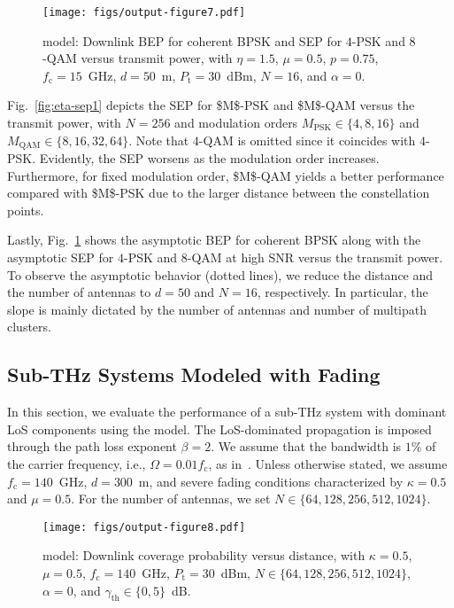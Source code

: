 \documentclass[journal,twocolumn]{IEEEtran}
\begin{document}
\begin{figure}[t]
    \centering
    \texttt{[image: figs/output-figure7.pdf]}
    \caption{\Ehm{} model: Downlink BEP for coherent \ac{BPSK} and \ac{SEP} for $4$-PSK and $8$-QAM versus transmit power, with $\eta = 1.5$, $\mu = 0.5$, $p=0.75$, $f_{\textrm{c}} = 15$~GHz, $d = 50$~m, $P_{\textrm{t}} = 30$~dBm, $N = 16$, and $\alpha=0$.}
    \label{fig:eta-asympt}
\end{figure}

Fig.~\ref{fig:eta-sep1} depicts the \ac{SEP} for \ac{$M$-PSK} and \ac{$M$-QAM} versus the transmit power, with $N=256$ and modulation orders $M_{\textrm{PSK}}\in\{4,8,16\}$ and $M_{\textrm{QAM}}\in\{8,16,32,64\}$. Note that $4$-QAM is omitted since it coincides with $4$-PSK. Evidently, the \ac{SEP} worsens as the modulation order increases. Furthermore, for fixed modulation order, \ac{$M$-QAM} yields a better performance compared with \ac{$M$-PSK} due to the larger distance between the constellation points.

Lastly, Fig.~\ref{fig:eta-asympt} shows the asymptotic \ac{BEP} for coherent \ac{BPSK} along with the asymptotic \ac{SEP} for $4$-PSK and $8$-QAM at high \ac{SNR} versus the transmit power. To observe the asymptotic behavior (dotted lines), we reduce the distance and the number of antennas to $d=50$ and $N=16$, respectively. In particular, the slope is mainly dictated by the number of antennas and number of multipath clusters.



\subsection{Sub-THz Systems Modeled with \km{} Fading} \label{sec:num_subthz}

In this section, we evaluate the performance of a sub-THz system with dominant \ac{LoS} components using the \km{} model. The \ac{LoS}-dominated propagation is imposed through the path loss exponent $\beta = 2$. We assume that the bandwidth is $1 \%$ of the carrier frequency, i.e., $\Omega = 0.01 f_{\textrm{c}}$, as in~\cite{Xin22}. Unless otherwise stated, we assume $f_{\textrm{c}} = 140$~GHz, $d=300$~m, and severe fading conditions characterized by $\kappa = 0.5$ and $\mu = 0.5$. For the number of antennas, we set $N \in \{64,128,256,512,1024\}$.

\begin{figure}[t]
\centering
\texttt{[image: figs/output-figure8.pdf]}
\caption{\km{} model: Downlink coverage probability versus distance, with $\kappa = 0.5$, $\mu = 0.5$, $f_\textrm{c} = 140$~GHz, $P_{\textrm{t}} = 30$~dBm,  $N \in \{64,128,256,512,1024\}$, $\alpha=0$, and $\gamma_{\textrm{th}} \in \{0,5\}$~dB.}
\label{fig:kappa-coverage2}
\end{figure}
\end{document}
